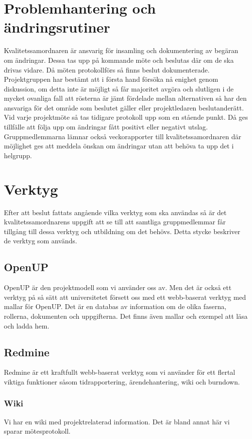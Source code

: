 \section{Problemhantering och ändringsrutiner}
Kvalitetssamordnaren är ansvarig för insamling och dokumentering av begäran om ändringar. Dessa tas upp på kommande möte och beslutas där om de ska drivas vidare. Då möten protokollförs så finns beslut dokumenterade. Projektgruppen har bestämt att i första hand försöka nå enighet genom diskussion, om detta inte är möjligt så får majoritet avgöra och slutligen i de mycket ovanliga fall att rösterna är jämt fördelade mellan alternativen så har den ansvariga för det område som beslutet gäller eller projektledaren beslutanderätt. Vid varje projektmöte så tas tidigare protokoll upp som en stående punkt. Då ges tillfälle att följa upp om ändringar fått positivt eller negativt utslag. Gruppmedlemmarna lämnar också veckorapporter till kvalitetssamordnaren där möjlighet ges att meddela önskan om ändringar utan att behöva ta upp det i helgrupp.

\section{Verktyg}
Efter att beslut fattats angående vilka verktyg som ska användas så är det kvalitetssamordnarens uppgift att se till att samtliga gruppmedlemmar får tillgång till dessa verktyg och utbildning om det behövs. Detta stycke beskriver de verktyg som används.

\subsection{OpenUP}
OpenUP är den projektmodell som vi använder oss av. Men det är också ett verktyg på så sätt att universitetet försett oss med ett webb-baserat verktyg med mallar för OpenUP. Det är en databas av information om de olika faserna, rollerna, dokumenten och uppgifterna. Det finns även mallar och exempel att läsa och ladda hem.

\subsection{Redmine}
Redmine är ett kraftfullt webb-baserat verktyg som vi använder för ett flertal viktiga funktioner såsom tidrapportering, ärendehantering, wiki och burndown.

\subsubsection{Wiki}
Vi har en wiki med projektrelaterad information. Det är bland annat här vi sparar mötesprotokoll.

